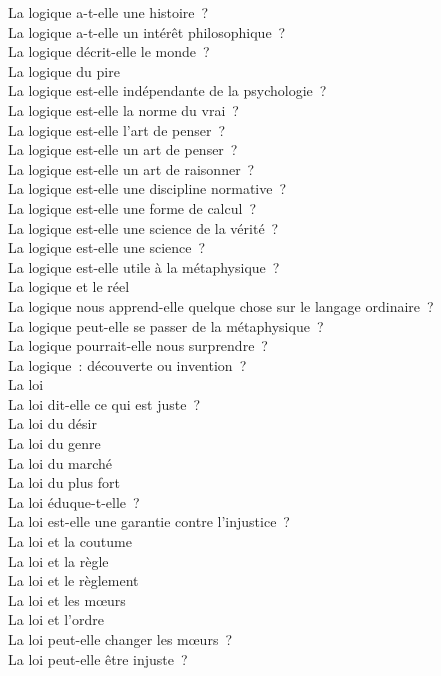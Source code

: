 \documentclass[a4paper,12pt]{article}
\begin{document}
La logique a-t-elle une histoire ? \\
La logique a-t-elle un intérêt philosophique ? \\
La logique décrit-elle le monde ? \\
La logique du pire \\
La logique est-elle indépendante de la psychologie ? \\
La logique est-elle la norme du vrai ? \\
La logique est-elle l'art de penser ? \\
La logique est-elle un art de penser ? \\
La logique est-elle un art de raisonner ? \\
La logique est-elle une discipline normative ? \\
La logique est-elle une forme de calcul ? \\
La logique est-elle une science de la vérité ? \\
La logique est-elle une science ? \\
La logique est-elle utile à la métaphysique ? \\
La logique et le réel \\
La logique nous apprend-elle quelque chose sur le langage ordinaire ? \\
La logique peut-elle se passer de la métaphysique ? \\
La logique pourrait-elle nous surprendre ? \\
La logique : découverte ou invention ? \\
La loi \\
La loi dit-elle ce qui est juste ? \\
La loi du désir \\
La loi du genre \\
La loi du marché \\
La loi du plus fort \\
La loi éduque-t-elle ? \\
La loi est-elle une garantie contre l'injustice ? \\
La loi et la coutume \\
La loi et la règle \\
La loi et le règlement \\
La loi et les mœurs \\
La loi et l'ordre \\
La loi peut-elle changer les mœurs ? \\
La loi peut-elle être injuste ? \\
\end{document}
